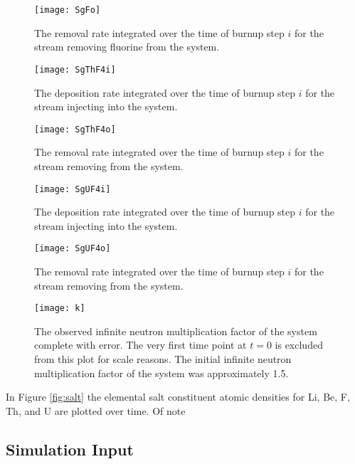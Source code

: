 \begin{figure}[H]
    \centering
    \texttt{[image: SgFo]}
    \caption{The removal rate integrated over the time of burnup step $i$
    for the stream removing fluorine from the system.}
    \label{fig:SgFo}
\end{figure}

\begin{figure}[H]
    \centering
    \texttt{[image: SgThF4i]}
    \caption{The deposition rate integrated over the time of burnup step $i$
    for the stream injecting  into the system.}
    \label{fig:SgThF4i}
\end{figure}

\begin{figure}[H]
    \centering
    \texttt{[image: SgThF4o]}
    \caption{The removal rate integrated over the time of burnup step $i$
    for the stream removing  from the system.}
    \label{fig:SgThF4o}
\end{figure}

\begin{figure}[H]
    \centering
    \texttt{[image: SgUF4i]}
    \caption{The deposition rate integrated over the time of burnup step $i$
    for the stream injecting  into the system.}
    \label{fig:SgUF4i}
\end{figure}

\begin{figure}[H]
    \centering
    \texttt{[image: SgUF4o]}
    \caption{The removal rate integrated over the time of burnup step $i$
    for the stream removing  from the system.}
    \label{fig:SgUF4o}
\end{figure}

\begin{figure}[H]
    \centering
    \texttt{[image: k]}
    \caption{The observed infinite neutron multiplication factor of the system
    complete with error. The very first time point at $t=0$ is excluded from
    this plot for scale reasons. The initial infinite neutron multiplication 
    factor of the system was approximately 1.5.}
    \label{fig:k}
\end{figure}

In Figure \ref{fig:salt} the elemental salt constituent atomic
densities for Li, Be, F, Th, and U are plotted over time. Of note  

\subsection{Simulation Input}\label{ssec:input}

